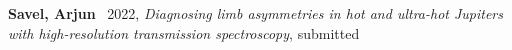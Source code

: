 \nreview
{}

\setcounter{countername}{\nreview} %
\item[{\color{numcolor}\scriptsize\the\value{countername}}]\textbf{Savel, Arjun} \etal\, 2022, \emph{Diagnosing limb asymmetries in hot and ultra-hot Jupiters with high-resolution transmission spectroscopy}, submitted
\addtocounter{countername}{-1}

